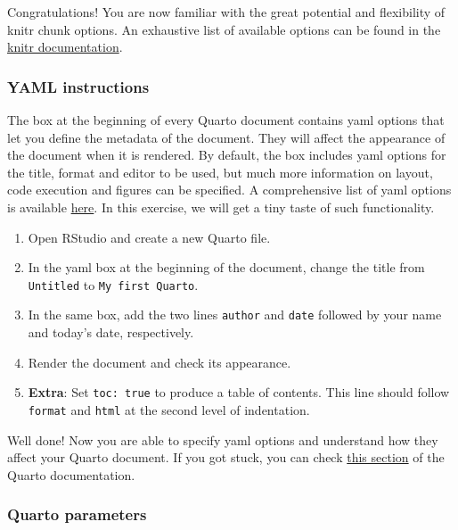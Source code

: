 \documentclass[
]{book}
\providecommand{\tightlist}{%
  \setlength{\itemsep}{0pt}\setlength{\parskip}{0pt}}
\begin{document}
Congratulations! You are now familiar with the great potential and flexibility
of knitr chunk options. An exhaustive list of available options can be found
in the \href{https://yihui.org/knitr/options/}{knitr documentation}.

\hypertarget{yaml-instructions}{%
\subsubsection{YAML instructions}\label{yaml-instructions}}

The box at the beginning of every Quarto document contains yaml options that let
you define the metadata of the document. They will affect the appearance of the
document when it is rendered. By default, the box includes yaml options for the
title, format and editor to be used, but much more information on layout, code
execution and figures can be specified. A comprehensive list of yaml options is
available \href{https://quarto.org/docs/reference/formats/html.html}{here}. In this
exercise, we will get a tiny taste of such functionality.

\begin{enumerate}
\def\labelenumi{\arabic{enumi}.}
\tightlist
\item
  Open RStudio and create a new Quarto file.
\item
  In the yaml box at the beginning of the document, change the title from
  \texttt{Untitled} to \texttt{My\ first\ Quarto}.
\item
  In the same box, add the two lines \texttt{author} and \texttt{date} followed by your name
  and today's date, respectively.
\item
  Render the document and check its appearance.
\item
  \textbf{Extra}: Set \texttt{toc:\ true} to produce a table of contents. This line should
  follow \texttt{format} and \texttt{html} at the second level of indentation.
\end{enumerate}

Well done! Now you are able to specify yaml options and understand how they
affect your Quarto document. If you got stuck, you can check
\href{https://quarto.org/docs/tools/rstudio.html\#yaml-intelligence}{this section} of
the Quarto documentation.

\hypertarget{quarto-parameters}{%
\subsubsection{Quarto parameters}\label{quarto-parameters}}
\end{document}
